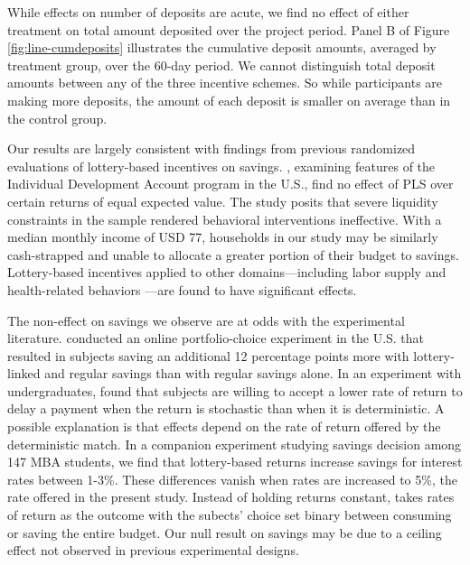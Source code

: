 \documentclass[11pt]{article}
\begin{document}



		While effects on number of deposits are acute, we find no effect of either treatment on total amount deposited over the project period. Panel B of Figure \ref{fig:line-cumdeposits} illustrates the cumulative deposit amounts, averaged by treatment group, over the 60-day period. We cannot distinguish total deposit amounts between any of the three incentive schemes. So while participants are making more deposits, the amount of each deposit is smaller on average than in the control group.

		Our results are largely consistent with findings from previous randomized evaluations of lottery-based incentives on savings. , examining features of the Individual Development Account program in the U.S., find no effect of PLS over certain returns of equal expected value. The study posits that severe liquidity constraints in the sample rendered behavioral interventions ineffective. With a median monthly income of USD 77, households in our study may be similarly cash-strapped and unable to allocate a greater portion of their budget to savings. Lottery-based incentives applied to other domains---including labor supply  and health-related behaviors ---are found to have significant effects.


		The non-effect on savings we observe are at odds with the experimental literature.  conducted an online portfolio-choice experiment in the U.S. that resulted in subjects saving an additional 12 percentage points more with lottery-linked and regular savings than with regular savings alone. In an experiment with undergraduates,  found that subjects are willing to accept a lower rate of return to delay a payment when the return is stochastic than when it is deterministic. A possible explanation is that effects depend on the rate of return offered by the deterministic match. In a companion experiment studying savings decision among 147 MBA students, we find that lottery-based returns increase savings for interest rates between 1-3\%. These differences vanish when rates are increased to 5\%, the rate offered in the present study. Instead of holding returns constant,  takes rates of return as the outcome with the subects' choice set binary between consuming or saving the entire budget. Our null result on savings may be due to a ceiling effect not observed in previous experimental designs.
\end{document}
